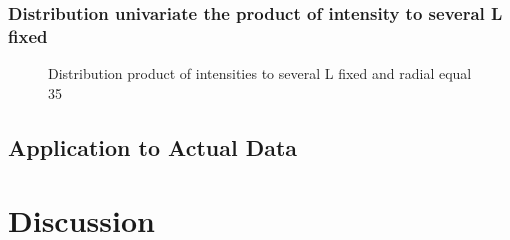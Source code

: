 \documentclass[remotesensing,article,submit,moreauthors,pdftex]{Definitions/mdpi}
\begin{document}
   
   
   
\subsubsection{Distribution univariate the product of intensity to several L fixed}



\begin{figure}[hbt]
	\centering
     \caption{Distribution product of intensities to several L fixed and radial equal 35}
     \label{fig:evid_bordas_l}
   \end{figure}	

\subsection{Application to Actual Data}
\section{Discussion}
\end{document}
